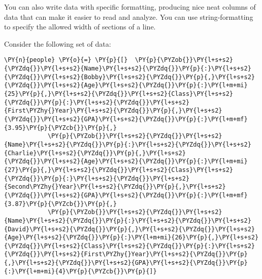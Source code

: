     You can also write data with specific formatting, producing nice neat
columns of data that can make it easier to read and analyze. You can use
string-formatting to specify the allowed width of sections of a line.

Consider the following set of data:

    \begin{tcolorbox}[breakable, size=fbox, boxrule=1pt, pad at break*=1mm,colback=cellbackground, colframe=cellborder]
\begin{Verbatim}[commandchars=\\\{\}]
\PY{n}{people} \PY{o}{=} \PY{p}{[}  \PY{p}{\PYZob{}}\PY{l+s+s2}{\PYZdq{}}\PY{l+s+s2}{Name}\PY{l+s+s2}{\PYZdq{}}\PY{p}{:}\PY{l+s+s2}{\PYZdq{}}\PY{l+s+s2}{Bobby}\PY{l+s+s2}{\PYZdq{}}\PY{p}{,}\PY{l+s+s2}{\PYZdq{}}\PY{l+s+s2}{Age}\PY{l+s+s2}{\PYZdq{}}\PY{p}{:}\PY{l+m+mi}{25}\PY{p}{,}\PY{l+s+s2}{\PYZdq{}}\PY{l+s+s2}{Class}\PY{l+s+s2}{\PYZdq{}}\PY{p}{:}\PY{l+s+s2}{\PYZdq{}}\PY{l+s+s2}{First\PYZhy{}Year}\PY{l+s+s2}{\PYZdq{}}\PY{p}{,}\PY{l+s+s2}{\PYZdq{}}\PY{l+s+s2}{GPA}\PY{l+s+s2}{\PYZdq{}}\PY{p}{:}\PY{l+m+mf}{3.95}\PY{p}{\PYZcb{}}\PY{p}{,}
            \PY{p}{\PYZob{}}\PY{l+s+s2}{\PYZdq{}}\PY{l+s+s2}{Name}\PY{l+s+s2}{\PYZdq{}}\PY{p}{:}\PY{l+s+s2}{\PYZdq{}}\PY{l+s+s2}{Charlie}\PY{l+s+s2}{\PYZdq{}}\PY{p}{,}\PY{l+s+s2}{\PYZdq{}}\PY{l+s+s2}{Age}\PY{l+s+s2}{\PYZdq{}}\PY{p}{:}\PY{l+m+mi}{27}\PY{p}{,}\PY{l+s+s2}{\PYZdq{}}\PY{l+s+s2}{Class}\PY{l+s+s2}{\PYZdq{}}\PY{p}{:}\PY{l+s+s2}{\PYZdq{}}\PY{l+s+s2}{Second\PYZhy{}Year}\PY{l+s+s2}{\PYZdq{}}\PY{p}{,}\PY{l+s+s2}{\PYZdq{}}\PY{l+s+s2}{GPA}\PY{l+s+s2}{\PYZdq{}}\PY{p}{:}\PY{l+m+mf}{3.87}\PY{p}{\PYZcb{}}\PY{p}{,}
            \PY{p}{\PYZob{}}\PY{l+s+s2}{\PYZdq{}}\PY{l+s+s2}{Name}\PY{l+s+s2}{\PYZdq{}}\PY{p}{:}\PY{l+s+s2}{\PYZdq{}}\PY{l+s+s2}{David}\PY{l+s+s2}{\PYZdq{}}\PY{p}{,}\PY{l+s+s2}{\PYZdq{}}\PY{l+s+s2}{Age}\PY{l+s+s2}{\PYZdq{}}\PY{p}{:}\PY{l+m+mi}{26}\PY{p}{,}\PY{l+s+s2}{\PYZdq{}}\PY{l+s+s2}{Class}\PY{l+s+s2}{\PYZdq{}}\PY{p}{:}\PY{l+s+s2}{\PYZdq{}}\PY{l+s+s2}{First\PYZhy{}Year}\PY{l+s+s2}{\PYZdq{}}\PY{p}{,}\PY{l+s+s2}{\PYZdq{}}\PY{l+s+s2}{GPA}\PY{l+s+s2}{\PYZdq{}}\PY{p}{:}\PY{l+m+mi}{4}\PY{p}{\PYZcb{}}\PY{p}{]}


\end{Verbatim}
\end{tcolorbox}
